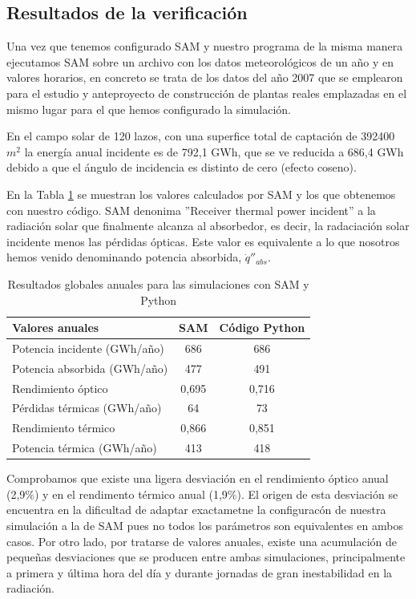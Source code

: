 \subsection{Resultados de la verificación}
\label{resultados-validacion}
 
Una vez que tenemos configurado SAM y nuestro programa de la misma manera ejecutamos SAM sobre un archivo con los datos meteorológicos de un año y en valores horarios, en concreto se trata de los datos del año 2007 que se emplearon para el estudio y anteproyecto de construcción de plantas reales emplazadas en el mismo lugar para el que hemos configurado la simulación.  

En el campo solar de 120 lazos, con una superfice total de captación de 392400 $m^2$ la energía anual incidente es de 792,1 GWh, que se ve reducida a 686,4 GWh debido a que el ángulo de incidencia es distinto de cero (efecto coseno).

En la Tabla \ref{tab:generacion_anual} se muestran los valores  calculados por SAM y los que obtenemos con nuestro código. SAM denonima ''Receiver thermal power incident'' a la radiación solar que finalmente alcanza al absorbedor, es decir, la radaciación solar incidente menos las pérdidas ópticas. Este valor es equivalente a lo que nosotros hemos venido denominando potencia absorbida, $\dot q''_{abs}$. 

\begin{table}[H]
\centering
\caption{Resultados globales anuales para las simulaciones con SAM y Python}
\label{tab:generacion_anual}
\begin{tabular}{lcc}
Valores anuales  & SAM & Código Python \\ \hline
Potencia incidente (GWh/año)	& 686		& 686			\\ 
Potencia absorbida (GWh/año)	& 477		& 491			\\ 
Rendimiento óptico 			& 0,695	 	& 0,716			\\ 
Pérdidas térmicas (GWh/año)	& 64		& 73			\\ 
Rendimiento térmico			& 0,866		& 0,851			\\ 
Potencia térmica (GWh/año) 	& 413		& 418	        	\\ 
\end{tabular}
\end{table}

Comprobamos que existe una ligera desviación en el rendimiento óptico anual (2,9\%) y en el rendimento térmico anual (1,9\%). El origen de esta desviación se encuentra en la dificultad de adaptar exactametne la configuracón de nuestra simulación a la de SAM pues no todos los parámetros son equivalentes en ambos casos. Por otro lado, por tratarse de valores anuales, existe una acumulación de pequeñas desviaciones que se producen entre ambas simulaciones, principalmente a primera y última hora del día  y durante jornadas de gran inestabilidad en la radiación. 

